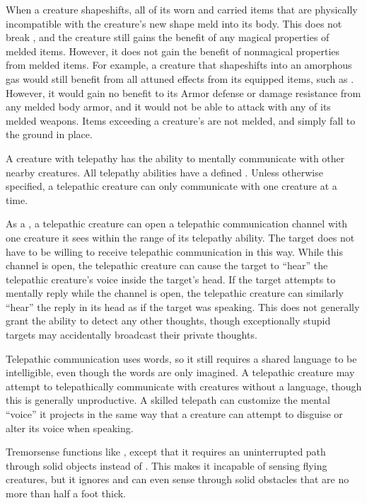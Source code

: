         When a creature shapeshifts, all of its worn and carried items that are physically incompatible with the creature's new shape meld into its body.
        This does not break , and the creature still gains the benefit of any magical properties of melded items.
        However, it does not gain the benefit of nonmagical properties from melded items.
        For example, a creature that shapeshifts into an amorphous gas would still benefit from all attuned effects from its equipped items, such as .
        However, it would gain no benefit to its Armor defense or damage resistance from any melded body armor, and it would not be able to attack with any of its melded weapons.
        Items exceeding a creature's  are not melded, and simply fall to the ground in place.

        A creature with telepathy has the ability to mentally communicate with other nearby creatures.
        All telepathy abilities have a defined .
        Unless otherwise specified, a telepathic creature can only communicate with one creature at a time.

        As a , a telepathic creature can open a telepathic communication channel with one creature it sees within the range of its telepathy ability.
        The target does not have to be willing to receive telepathic communication in this way.
        While this channel is open, the telepathic creature can cause the target to ``hear'' the telepathic creature's voice inside the target's head.
        If the target attempts to mentally reply while the channel is open, the telepathic creature can similarly ``hear'' the reply in its head as if the target was speaking.
        This does not generally grant the ability to detect any other thoughts, though exceptionally stupid targets may accidentally broadcast their private thoughts.

        Telepathic communication uses words, so it still requires a shared language to be intelligible, even though the words are only imagined.
        A telepathic creature may attempt to telepathically communicate with creatures without a language, though this is generally unproductive.
        A skilled telepath can customize the mental ``voice'' it projects in the same way that a creature can attempt to disguise or alter its voice when speaking.

        Tremorsense functions like , except that it requires an uninterrupted path through solid objects instead of .
        This makes it incapable of sensing flying creatures, but it ignores  and can even sense through solid obstacles that are no more than half a foot thick.

